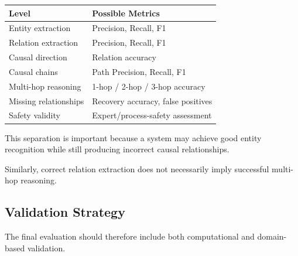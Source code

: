 \begin{center}
\begin{tabular}{ll}
\textbf{Level} & \textbf{Possible Metrics} \\
\hline
Entity extraction & Precision, Recall, F1 \\
Relation extraction & Precision, Recall, F1 \\
Causal direction & Relation accuracy \\
Causal chains & Path Precision, Recall, F1 \\
Multi-hop reasoning & 1-hop / 2-hop / 3-hop accuracy \\
Missing relationships & Recovery accuracy, false positives \\
Safety validity & Expert/process-safety assessment
\end{tabular}
\end{center}

This separation is important because a system may achieve good entity
recognition while still producing incorrect causal relationships.

Similarly, correct relation extraction does not necessarily imply
successful multi-hop reasoning.

\subsection{Validation Strategy}

The final evaluation should therefore include both computational and
domain-based validation.

\begin{center}
\end{center}

